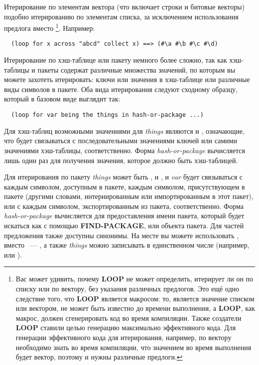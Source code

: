 Итерирование по элементам вектора (что включает строки и битовые векторы) подобно
итерированию по элементам списка, за исключением использования предлога 
вместо \footnote{Вас может удивить, почему \textbf{LOOP} не может определить,
  итерирует ли он по списку или по вектору, без указания различных предлогов. Это ещё одно
  следствие того, что \textbf{LOOP} является макросом: то, является значение списком или
  вектором, не может быть известно до времени выполнения, а \textbf{LOOP}, как макрос,
  должен сгенерировать код во время компиляции. Также создатели \textbf{LOOP} ставили
  целью генерацию максимально эффективного кода. Для генерации эффективного кода для
  итерирования, например, по вектору необходимо знать во время компиляции, что значением
  во время выполнения будет вектор, поэтому и нужны различные предлоги.}. Например:

\begin{lstlisting}
  (loop for x across "abcd" collect x) ==> (#\a #\b #\c #\d)
\end{lstlisting}

Итерирование по хэш-таблице или пакету немного более сложно, так как хэш-таблицы и пакеты
содержат различные множества значений, по которым вы можете захотеть итерировать: ключи
или значения в хэш-таблице или различные виды символов в пакете. Оба вида итерирования
следуют сходному образцу, который в базовом виде выглядит так:

\begin{lstlisting}
  (loop for var being the things in hash-or-package ...)
\end{lstlisting}

Для хэш-таблиц возможными значениями для \textit{things} являются  и
, означающие, что  будет связываться с последовательными
значениями ключей или самими значениями хэш-таблицы, соответственно. Форма
\textit{hash-or-package} вычисляется лишь один раз для получения значения, которое должно
быть хэш-таблицей.

Для итерирования по пакету \textit{things} может быть ,
 и , и \textit{var} будет связываться с
каждым символом, доступным в пакете, каждым символом, присутствующем в пакете (другими
словами, интернированным или импортированным в этот пакет), или с каждым символом,
экспортированным из пакета, соответственно. Форма \textit{hash-or-package} вычисляется для
предоставления имени пакета, который будет искаться как с помощью \textbf{FIND-PACKAGE},
или объекта пакета. Для частей предложения  также доступны синонимы. На месте
 вы можете использовать , вместо ~--- , а также
\textit{things} можно записывать в единственном числе (например,  или
).

